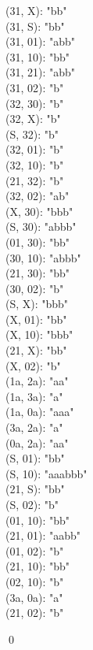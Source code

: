\documentclass[12pt,a4paper]{article}
\begin{document}
\begin{multicols}{5}
(31, X):  "bb" \\
(31, S):  "bb" \\
(31, 01): "abb" \\
(31, 10): "bb" \\
(31, 21): "abb" \\
(31, 02): "b" \\
(32, 30): "b" \\
(32, X):  "b" \\
(S, 32):  "b" \\
(32, 01): "b" \\
(32, 10): "b" \\
(21, 32): "b" \\
(32, 02): "ab" \\
(X, 30):  "bbb" \\
(S, 30):  "abbb" \\
(01, 30): "bb" \\
(30, 10): "abbb" \\
(21, 30): "bb" \\
(30, 02): "b" \\
(S, X):   "bbb" \\
(X, 01):  "bb" \\
(X, 10):  "bbb" \\
(21, X):  "bb" \\
(X, 02):  "b" \\
(1a, 2a): "aa" \\
(1a, 3a): "a" \\
(1a, 0a): "aaa" \\
(3a, 2a): "a" \\
(0a, 2a): "aa" \\
(S, 01):  "bb" \\
(S, 10):  "aaabbb" \\
(21, S):  "bb" \\
(S, 02):  "b" \\
(01, 10): "bb" \\
(21, 01): "aabb" \\
(01, 02): "b" \\
(21, 10): "bb" \\
(02, 10): "b" \\
(3a, 0a): "a" \\
(21, 02): "b"
\end{multicols}
\qed
\end{document}

